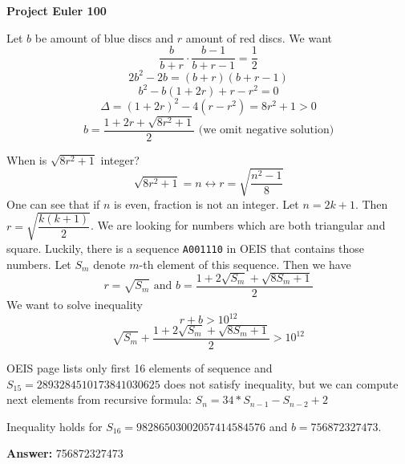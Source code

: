 \documentclass[a4paper,12pt]{article}
\begin{document}
\setlength\parindent{0pt}
\textbf{Project Euler 100}
\vspace{5ex}


Let \(b\) be amount of blue discs and \(r\) amount of red discs. We want
\[\frac{b}{b + r} \cdot \frac{b - 1}{b + r - 1} = \frac{1}{2}\]
\[2b^2-2b=(b+r)(b+r-1)\]
\[b^2 - b(1 + 2r) + r - r^2 = 0\]
\[\Delta = (1 + 2r)^2 - 4(r - r^2) = 8r^2 + 1 > 0\]
\[b = \frac{1 + 2r + \sqrt{8r^2 + 1}}{2} \text{ (we omit negative solution)}\]

When is \(\sqrt{8r^2 + 1}\) integer?
\[\sqrt{8r^2 + 1} = n \leftrightarrow r = \sqrt{\frac{n^2 - 1}{8}}\]
One can see that if \(n\) is even, fraction is not an integer.
Let \(n = 2k + 1\). Then \(r = \sqrt{\dfrac{k(k + 1)}{2}}\).
We are looking for numbers which are both triangular and square.
Luckily, there is a sequence \texttt{A001110} in OEIS that contains
those numbers. Let \(S_m\) denote \(m\)-th element of this sequence.
Then we have
\[r = \sqrt{S_m} \text{ and }
b = \frac{1 + 2\sqrt{S_m} + \sqrt{8S_m + 1}}{2}\]
We want to solve inequality
\[r + b > 10^{12}\]
\[\sqrt{S_m} + \frac{1 + 2\sqrt{S_m} + \sqrt{8S_m + 1}}{2} > 10^{12}\]

OEIS page lists only first 16 elements of sequence and
\(S_{15} = 2893284510173841030625\) does not satisfy inequality, but we can
compute next elements from recursive formula:
\(S_n = 34 * S_{n - 1} - S_{n - 2} + 2\)

Inequality holds for \(S_{16} = 98286503002057414584576\)
and \(b = 756872327473\).

\vspace{5ex}
\textbf{Answer:}
756872327473
\end{document}
